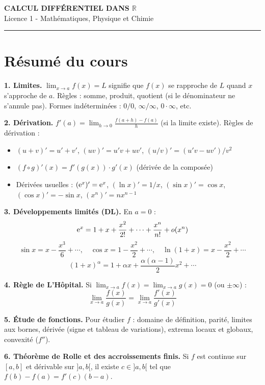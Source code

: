 \documentclass[12pt,a4paper]{article}
\begin{document}
\fi

\begin{center}
  {\LARGE\bfseries CALCUL DIFFÉRENTIEL DANS $\mathbb{R}$}\\[0.3cm]
  {\normalsize Licence 1 - Mathématiques, Physique et Chimie}\\[0.1cm]
  \rule{0.7\textwidth}{0.8pt}
\end{center}

\section*{Résumé du cours}

\begin{boiteresume}

\textbf{1. Limites.} $\lim_{x\to a}f(x)=L$ signifie que $f(x)$ se rapproche de $L$ quand $x$ s'approche de $a$. Règles : somme, produit, quotient (si le dénominateur ne s'annule pas). Formes indéterminées : $0/0$, $\infty/\infty$, $0\cdot\infty$, etc.

\textbf{2. Dérivation.} $f'(a) = \lim_{h\to0}\frac{f(a+h)-f(a)}{h}$ (si la limite existe). Règles de dérivation :
\begin{itemize}[nosep]
  \item $(u+v)' = u'+v'$, $(uv)' = u'v+uv'$, $(u/v)' = (u'v-uv')/v^2$
  \item $(f\circ g)'(x) = f'(g(x))\cdot g'(x)$ (dérivée de la composée)
  \item Dérivées usuelles : $(\mathrm{e}^x)'=\mathrm{e}^x$, $(\ln x)'=1/x$, $(\sin x)'=\cos x$, $(\cos x)'=-\sin x$, $(x^n)'=nx^{n-1}$
\end{itemize}

\textbf{3. Développements limités (DL).} En $a=0$ :
\[
\mathrm{e}^x = 1+x+\frac{x^2}{2!}+\cdots+\frac{x^n}{n!}+o(x^n)
\]
\[
\sin x = x - \frac{x^3}{6}+\cdots, \quad \cos x = 1-\frac{x^2}{2}+\cdots, \quad \ln(1+x) = x-\frac{x^2}{2}+\cdots
\]
\[
(1+x)^\alpha = 1+\alpha x+\frac{\alpha(\alpha-1)}{2}x^2+\cdots
\]

\textbf{4. Règle de L'Hôpital.} Si $\lim_{x\to a}f(x)=\lim_{x\to a}g(x)=0$ (ou $\pm\infty$) :
\[
\lim_{x\to a}\frac{f(x)}{g(x)} = \lim_{x\to a}\frac{f'(x)}{g'(x)}
\]

\textbf{5. Étude de fonctions.} Pour étudier $f$ : domaine de définition, parité, limites aux bornes, dérivée (signe et tableau de variations), extrema locaux et globaux, convexité ($f''$).

\textbf{6. Théorème de Rolle et des accroissements finis.} Si $f$ est continue sur $[a,b]$ et dérivable sur $]a,b[$, il existe $c\in]a,b[$ tel que $f(b)-f(a) = f'(c)(b-a)$.

\end{boiteresume}
\end{document}
